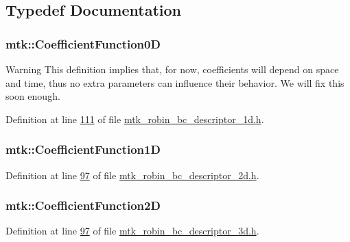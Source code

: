 \subsection{Typedef Documentation}
\hypertarget{group__c07-mim__ops_ga04276745b4d511f0f3c636d6e0df7c2d}{
\subsubsection[{Coefficient\+Function0\+D}]{\setlength{\rightskip}{0pt plus 5cm}mtk\+::\+Coefficient\+Function0\+D}}\label{group__c07-mim__ops_ga04276745b4d511f0f3c636d6e0df7c2d}
\begin{DoxyWarning}{Warning}
This definition implies that, for now, coefficients will depend on space and time, thus no extra parameters can influence their behavior. We will fix this soon enough. 
\end{DoxyWarning}


Definition at line \hyperlink{mtk__robin__bc__descriptor__1d_8h_source_l00111}{111} of file \hyperlink{mtk__robin__bc__descriptor__1d_8h_source}{mtk\+\_\+robin\+\_\+bc\+\_\+descriptor\+\_\+1d.\+h}.

\hypertarget{group__c07-mim__ops_gaa79593eeb6676d6011db339e01983909}{
\subsubsection[{Coefficient\+Function1\+D}]{\setlength{\rightskip}{0pt plus 5cm}mtk\+::\+Coefficient\+Function1\+D}}\label{group__c07-mim__ops_gaa79593eeb6676d6011db339e01983909}


Definition at line \hyperlink{mtk__robin__bc__descriptor__2d_8h_source_l00097}{97} of file \hyperlink{mtk__robin__bc__descriptor__2d_8h_source}{mtk\+\_\+robin\+\_\+bc\+\_\+descriptor\+\_\+2d.\+h}.

\hypertarget{group__c07-mim__ops_ga0ff293d1fd754006d64a3588971dc5c4}{
\subsubsection[{Coefficient\+Function2\+D}]{\setlength{\rightskip}{0pt plus 5cm}mtk\+::\+Coefficient\+Function2\+D}}\label{group__c07-mim__ops_ga0ff293d1fd754006d64a3588971dc5c4}


Definition at line \hyperlink{mtk__robin__bc__descriptor__3d_8h_source_l00097}{97} of file \hyperlink{mtk__robin__bc__descriptor__3d_8h_source}{mtk\+\_\+robin\+\_\+bc\+\_\+descriptor\+\_\+3d.\+h}.

